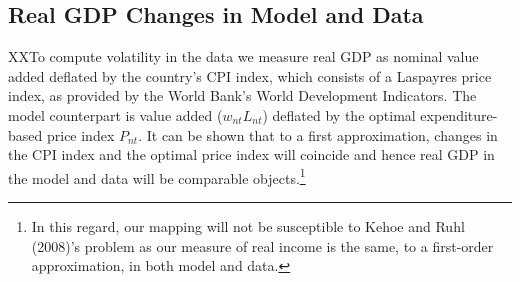 \documentclass[12pt]{article}
\begin{document}
\subsection{Real GDP Changes in Model and Data}

XXTo compute volatility in the data we measure real GDP as nominal value
added deflated by the country's CPI index, which consists of a Laspayres
price index, as provided by the World Bank's World Development Indicators.
The model counterpart is value added ($w_{nt}L_{nt}$) deflated by the
optimal expenditure-based price index $P_{nt}.$ It can be shown that to a
first approximation, changes in the CPI index and the optimal price index
will coincide and hence real GDP in the model and data will be comparable
objects.\footnote{%
In this regard, our mapping will not be susceptible to Kehoe and Ruhl
(2008)'s problem as our measure of real income is the same, to a first-order
approximation, in both model and data.}
\end{document}
